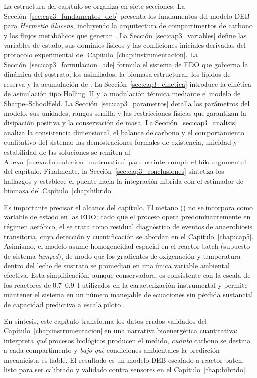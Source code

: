 La estructura del capítulo se organiza en siete secciones. La Sección~\ref{sec:cap3_fundamentos_deb} presenta los fundamentos del modelo DEB para \emph{Hermetia illucens}, incluyendo la arquitectura de compartimentos de carbono y los flujos metabólicos que generan . La Sección~\ref{sec:cap3_variables} define las variables de estado, sus dominios físicos y las condiciones iniciales derivadas del protocolo experimental del Capítulo~\ref{chap:instrumentacion}. La Sección~\ref{sec:cap3_formulacion_ode} formula el sistema de EDO que gobierna la dinámica del sustrato, los asimilados, la biomasa estructural, los lípidos de reserva y la acumulación de . La Sección~\ref{sec:cap3_cinetica} introduce la cinética de asimilación tipo Holling~II y la modulación térmica mediante el modelo de Sharpe--Schoolfield. La Sección~\ref{sec:cap3_parametros} detalla los parámetros del modelo, sus unidades, rangos semilla y las restricciones físicas que garantizan la disipación positiva y la conservación de masa. La Sección~\ref{sec:cap3_analisis} analiza la consistencia dimensional, el balance de carbono y el comportamiento cualitativo del sistema; las demostraciones formales de existencia, unicidad y estabilidad de las soluciones se remiten al Anexo~\ref{anexo:formulacion_matematica} para no interrumpir el hilo argumental del capítulo. Finalmente, la Sección~\ref{sec:cap3_conclusiones} sintetiza los hallazgos y establece el puente hacia la integración híbrida con el estimador de biomasa del Capítulo~\ref{chap:hibrido}.

Es importante precisar el alcance del capítulo. El metano () no se incorpora como variable de estado en las EDO; dado que el proceso opera predominantemente en régimen aeróbico, el  se trata como residual diagnóstico de eventos de anaerobiosis transitoria, cuya detección y cuantificación se abordan en el Capítulo~\ref{chap:cap5}. Asimismo, el modelo asume homogeneidad espacial en el reactor batch (supuesto de sistema \emph{lumped}), de modo que los gradientes de oxigenación y temperatura dentro del lecho de sustrato se promedian en una única variable ambiental efectiva. Esta simplificación, aunque conservadora, es consistente con la escala de los reactores de \num{0.7}--\num{0.9}~\si{\litre} utilizados en la caracterización instrumental y permite mantener el sistema en un número manejable de ecuaciones sin pérdida sustancial de capacidad predictiva a escala piloto \parencite{padmanabhaComprehensiveDynamicGrowth2020,rossiEstimatingDynamicsGreenhouse2024a}.

En síntesis, este capítulo transforma los datos crudos validados del Capítulo~\ref{chap:instrumentacion} en una narrativa bioenergética cuantitativa: interpreta \emph{qué} procesos biológicos producen el  medido, \emph{cuánto} carbono se destina a cada compartimento y \emph{bajo qué} condiciones ambientales la predicción mecanicista es fiable. El resultado es un modelo DEB escalado a reactor batch, listo para ser calibrado y validado contra sensores en el Capítulo~\ref{chap:hibrido}.